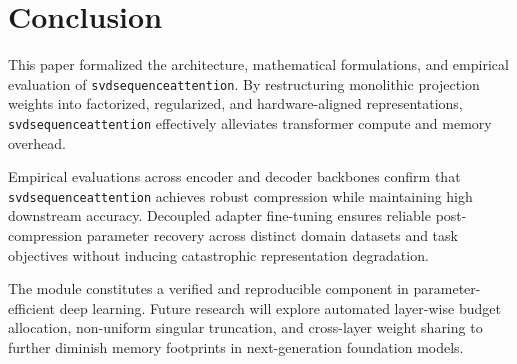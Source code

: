 \section{Conclusion}
This paper formalized the architecture, mathematical formulations, and empirical evaluation of \texttt{svdsequenceattention}. By restructuring monolithic projection weights into factorized, regularized, and hardware-aligned representations, \texttt{svdsequenceattention} effectively alleviates transformer compute and memory overhead.

Empirical evaluations across encoder and decoder backbones confirm that \texttt{svdsequenceattention} achieves robust compression while maintaining high downstream accuracy. Decoupled adapter fine-tuning ensures reliable post-compression parameter recovery across distinct domain datasets and task objectives without inducing catastrophic representation degradation.

The module constitutes a verified and reproducible component in parameter-efficient deep learning. Future research will explore automated layer-wise budget allocation, non-uniform singular truncation, and cross-layer weight sharing to further diminish memory footprints in next-generation foundation models.
